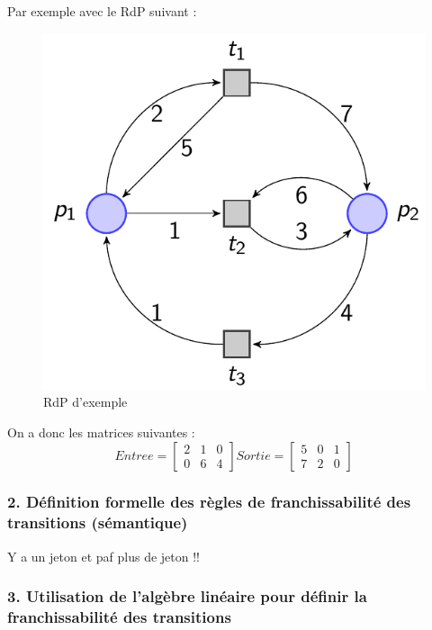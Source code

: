 \documentclass[12pt,a4paper,oneside]{article}
\begin{document}
		Par exemple avec le RdP suivant :

		\begin{figure}[h]
			\includegraphics[scale = 0.5]{./img/exrdp.png}
			\centering
			\caption{RdP d'exemple}
		\end{figure}

		On a donc les matrices suivantes :
		$$Entree = \begin{bmatrix}
			2 & 1 & 0 \\
			0 & 6 & 4
		\end{bmatrix}
		Sortie = \begin{bmatrix}
			5 & 0 & 1 \\
			7 & 2 & 0
		\end{bmatrix}$$


	\subsubsection*{2. Définition formelle des règles de franchissabilité des transitions (sémantique)}
		Y a un jeton et paf plus de jeton !!

	\subsubsection*{3. Utilisation de l’algèbre linéaire pour définir la franchissabilité des transitions}
\end{document}
